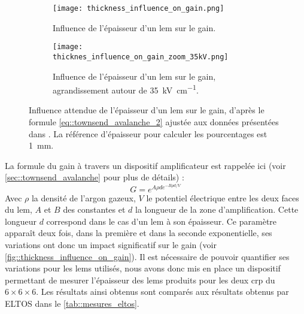                 \begin{figure}[htbp]
                    \begin{subfigure}[t]{0.48\textwidth}
                        \texttt{[image: thickness\_influence\_on\_gain.png]}
                        \caption{Influence de l'épaisseur d'un \gls{lem} sur le gain.}
                    \end{subfigure}
                    \hfill
                    \begin{subfigure}[t]{0.48\textwidth}
                        \texttt{[image: thicknes\_influence\_on\_gain\_zoom\_35kV.png]}
                        \caption{Influence de l'épaisseur d'un \gls{lem} sur le gain, agrandissement autour de \SI{35}{\kilo\volt\per\centi\meter}.}
                    \end{subfigure}
                    \caption[Influence de l'épaisseur d'un \gls{lem} sur le gain.]{Influence attendue de l'épaisseur d'un \gls{lem} sur le gain, d'après le formule \eqref{eq::townsend_avalanche_2} ajustée aux données présentées dans \cite{Cantini2014}. La référence d'épaisseur pour calculer les pourcentages est \SI{1}{\milli\meter}.}
                    \label{fig::thickness_influence_on_gain}
                \end{figure}
            
                La formule du gain à travers un dispositif amplificateur est rappelée ici (voir \autoref{sec::townsend_avalanche} pour plus de détails) :
                \begin{equation}\label{eq::townsend_avalanche_2}
                    G = e^{A\rho d e^{-B\rho d/V}}
                \end{equation}
                Avec $\rho$ la densité de l'argon gazeux, $V$ le potentiel électrique entre les deux faces du \gls{lem}, $A$ et $B$ des constantes et $d$ la longueur de la zone d'amplification. Cette longueur $d$ correspond dans le cas d'un \gls{lem} à son épaisseur. Ce paramètre apparaît deux fois, dans la première et dans la seconde exponentielle, ses variations ont donc un impact significatif sur le gain (voir \autoref{fig::thickness_influence_on_gain}). Il est nécessaire de pouvoir quantifier ses variations pour les \glspl{lem} utilisés, nous avons donc mis en place un dispositif permettant de mesurer l'épaisseur des \glspl{lem} produits pour les deux \gls{crp} du $6\times6\times6$. Les résultats ainsi obtenus sont comparés aux résultats obtenus par ELTOS dans le \autoref{tab::mesures_eltos}.
                
